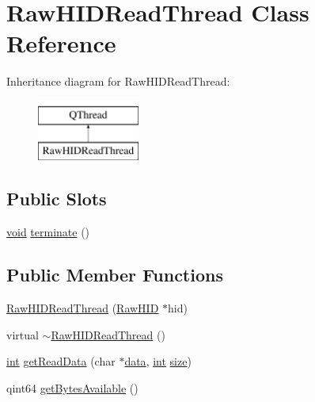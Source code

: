\hypertarget{class_raw_h_i_d_read_thread}{\section{Raw\-H\-I\-D\-Read\-Thread Class Reference}
\label{class_raw_h_i_d_read_thread}
}
Inheritance diagram for Raw\-H\-I\-D\-Read\-Thread\-:\begin{figure}[H]
\begin{center}
\leavevmode
\includegraphics[height=2.000000cm]{class_raw_h_i_d_read_thread}
\end{center}
\end{figure}
\subsection*{Public Slots}
\begin{DoxyCompactItemize}
\item 
\hyperlink{group___u_a_v_objects_plugin_ga444cf2ff3f0ecbe028adce838d373f5c}{void} \hyperlink{group___raw_h_i_d_plugin_ga9a2b05a16852317c6f30aa1171b4e605}{terminate} ()
\end{DoxyCompactItemize}
\subsection*{Public Member Functions}
\begin{DoxyCompactItemize}
\item 
\hyperlink{group___raw_h_i_d_plugin_ga4a906f373d862e82a9c6972a5144a9ce}{Raw\-H\-I\-D\-Read\-Thread} (\hyperlink{class_raw_h_i_d}{Raw\-H\-I\-D} $\ast$hid)
\item 
virtual \hyperlink{group___raw_h_i_d_plugin_ga39a7dfe6227270e9721fb326ed792805}{$\sim$\-Raw\-H\-I\-D\-Read\-Thread} ()
\item 
\hyperlink{ioapi_8h_a787fa3cf048117ba7123753c1e74fcd6}{int} \hyperlink{group___raw_h_i_d_plugin_gaa619bfb605e0c07b6a33147d451490cb}{get\-Read\-Data} (char $\ast$\hyperlink{glext_8h_a8850df0785e6fbcc2351af3b686b8c7a}{data}, \hyperlink{ioapi_8h_a787fa3cf048117ba7123753c1e74fcd6}{int} \hyperlink{glext_8h_a014d89bd76f74ef3a29c8f04b473eb76}{size})
\item 
qint64 \hyperlink{group___raw_h_i_d_plugin_ga7a009b110ddd862add0a221ad4072e75}{get\-Bytes\-Available} ()
\end{DoxyCompactItemize}
